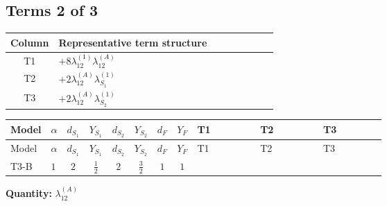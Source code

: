 \documentclass[8pt]{article}
\begin{document}
\begin{landscape}
\subsection*{Terms 2 of 3}
\begin{center}
\begin{tabular}{@{}c >{\raggedright\arraybackslash}p{0.82\linewidth}@{}}
\toprule
Column & Representative term structure \\
\midrule
T1 & \(\displaystyle +8 {\lambda_{12}^{(1)}} {\lambda_{12}^{(A)}}\) \\
\midrule
T2 & \(\displaystyle +2 {\lambda_{12}^{(A)}} {\lambda_{S_1}^{(1)}}\) \\
\midrule
T3 & \(\displaystyle +2 {\lambda_{12}^{(A)}} {\lambda_{S_2}^{(1)}}\) \\
\midrule
\bottomrule
\end{tabular}
\end{center}
\smallskip
\tiny
\begin{longtable}{@{}llcccccc >{\raggedright\arraybackslash}p{0.21\linewidth} >{\raggedright\arraybackslash}p{0.21\linewidth} >{\raggedright\arraybackslash}p{0.21\linewidth}@{}}
\toprule
Model & $\alpha$ & $d_{S_1}$ & $Y_{S_1}$ & $d_{S_2}$ & $Y_{S_2}$ & $d_F$ & $Y_F$ & T1 & T2 & T3 \\
\midrule
\endfirsthead
\toprule
Model & $\alpha$ & $d_{S_1}$ & $Y_{S_1}$ & $d_{S_2}$ & $Y_{S_2}$ & $d_F$ & $Y_F$ & T1 & T2 & T3 \\
\midrule
\endhead
T3-B & $1$ & $2$ & $\frac{1}{2}$ & $2$ & $\frac{3}{2}$ & $1$ & $1$ & \scriptsize\adjustbox{max width=\linewidth}{$\begin{gathered} +8 {\lambda_{12}^{(1)}} {\lambda_{12}^{(A)}}\end{gathered}$} & \scriptsize\adjustbox{max width=\linewidth}{$\begin{gathered} +2 {\lambda_{12}^{(A)}} {\lambda_{S_1}^{(1)}}\end{gathered}$} & \scriptsize\adjustbox{max width=\linewidth}{$\begin{gathered} +2 {\lambda_{12}^{(A)}} {\lambda_{S_2}^{(1)}}\end{gathered}$} \\
\midrule
\bottomrule
\end{longtable}
\clearpage
\noindent\textbf{Quantity: }$\lambda_{12}^{(A)}$\par\smallskip

\end{landscape}
\end{document}
